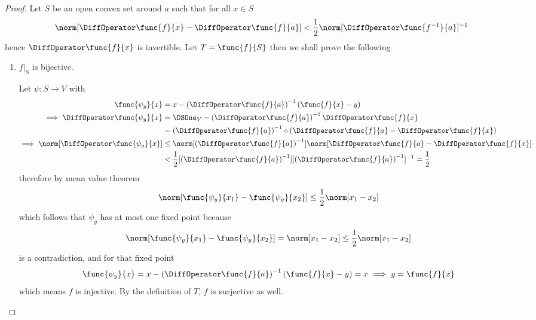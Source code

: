 \begin{proof}
    Let \(S\) be an open convex set around \(a\) such that for all \(x \in S\)
    \begin{equation*}
        \norm[\DiffOperator \func{f}{x} - \DiffOperator \func{f}{a}] < \dfrac{1}{2} \norm[\DiffOperator \func{f^{-1}}{a}]^{-1}
    \end{equation*}
    hence \(\DiffOperator \func{f}{x}\) is invertible. Let \(T = \func{f}{S}\) then we shall prove the following
    \begin{enumerate}
        \item \(f|_S\) is bijective.

              Let \(\psi : S \to V\) with
              \begin{align*}
                  \func{\psi_y}{x}                                & = x - \left(\DiffOperator \func{f}{a}\right)^{-1} (\func{f}{x} - y)                                                            \\
                  \implies \DiffOperator \func{\psi_y}{x }        & = \DSOne_V - \left(\DiffOperator \func{f}{a}\right)^{-1} \DiffOperator \func{f}{x}                                             \\
                                                                  & = \left(\DiffOperator \func{f}{a}\right)^{-1} \circ \left( \DiffOperator \func{f}{a} - \DiffOperator \func{f}{x} \right)       \\
                  \implies \norm[\DiffOperator \func{\psi_y}{x }] & \leq \norm[\left(\DiffOperator \func{f}{a}\right)^{-1}] \norm[\DiffOperator \func{f}{a} - \DiffOperator \func{f}{x}]           \\
                                                                  & < \dfrac{1}{2} [\left(\DiffOperator \func{f}{a}\right)^{-1}] [\left(\DiffOperator \func{f}{a}\right)^{-1}]^{-1} = \dfrac{1}{2}
              \end{align*}
              therefore by mean value theorem
              \begin{equation*}
                  \norm[\func{\psi_y}{x_1} - \func{\psi_y}{x_2}] \leq \dfrac{1}{2} \norm[x_1 - x_2]
              \end{equation*}
              which follows that \(\psi_y\) has at most one fixed point because
              \begin{equation*}
                  \norm[\func{\psi_y}{x_1} - \func{\psi_y}{x_2}] = \norm[x_1 - x_2] \leq  \dfrac{1}{2} \norm[x_1 - x_2]
              \end{equation*}
              is a contradiction, and for that fixed point
              \begin{equation*}
                  \func{\psi_y}{x} = x - \left(\DiffOperator \func{f}{a}\right)^{-1} (\func{f}{x} - y) = x \implies y = \func{f}{x}
              \end{equation*}
              which means \(f\) is injective. By the definition of \(T\), \(f\) is surjective as well.


\end{enumerate}
\end{proof}
